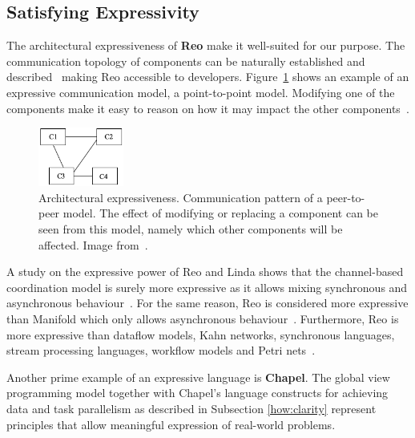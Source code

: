\subsection{Satisfying Expressivity}
\label{sec:how:expressivity}


The architectural expressiveness of \textbf{Reo} make it well-suited for our purpose. The communication topology of components can be naturally established and described~\cite{criticalPathReo} making Reo accessible to developers. Figure~\ref{fig:reoArch} shows an example of an expressive communication model, a point-to-point model. Modifying one of the components make it easy to reason on how it may impact the other components~\cite{introReo}.
\begin{figure}
\centering
\includegraphics[page=1, width=0.25\textwidth]{images/reoArch.png}
\caption[h]{Architectural expressiveness. Communication pattern of a peer-to-peer model. The effect of modifying or replacing a component can be seen from this model, namely which other components will be affected. Image from~\cite{introReo}.}
\label{fig:reoArch}
\end{figure}

A study on the expressive power of Reo and Linda shows that the channel-based coordination model is surely more expressive as it allows mixing synchronous and asynchronous behaviour~\cite{reoLinda}.
For the same reason, Reo is considered more expressive than Manifold which only allows asynchronous behaviour~\cite{criticalPathReo}. 
Furthermore, Reo is more expressive than dataflow models, Kahn networks, synchronous languages, stream processing languages, workflow models and Petri nets~\cite{proper}.


Another prime example of an expressive language is \textbf{Chapel}. The global view programming model together with Chapel's language constructs for achieving data and task parallelism as described in Subsection \ref{how:clarity} represent principles that allow meaningful expression of real-world problems. 

